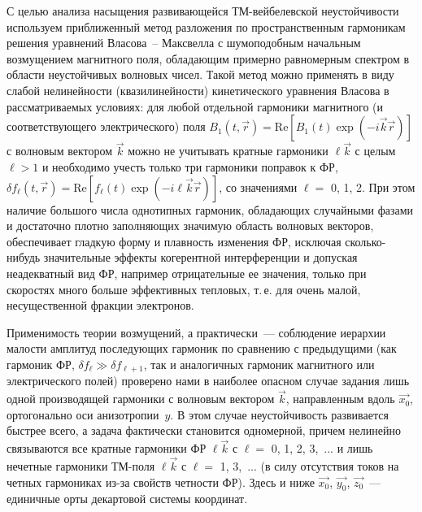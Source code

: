 С целью анализа насыщения развивающейся ТМ-вейбелевской неустойчивости используем приближенный метод разложения по пространственным гармоникам решения уравнений Власова~-- Максвелла с шумоподобным начальным возмущением магнитного поля, обладающим примерно равномерным спектром в области неустойчивых волновых чисел. Такой метод можно применять в виду слабой нелинейности (квазилинейности) кинетического уравнения Власова в рассматриваемых условиях: для любой отдельной гармоники магнитного (и соответствующего электрического) поля $B_1(t,\vec{r})= \mathrm{Re} \left[ B_1(t)\exp(-i\vec{k} \vec{r}) \right]$ с волновым вектором $\vec{k}$ можно не учитывать кратные гармоники $\ell \vec{k}$ с целым $\ell > 1$ и необходимо учесть только три гармоники поправок к ФР, $\delta f_\ell(t, \vec{r})=\mathrm{Re} \left[ f_\ell(t)\exp(-i\ell\vec{k}\vec{r}) \right]$, со значениями $\ell =$ 0, 1, 2. При этом наличие большого числа однотипных гармоник, обладающих случайными фазами и достаточно плотно заполняющих значимую область волновых векторов, обеспечивает гладкую форму и плавность изменения ФР, исключая сколько-нибудь значительные эффекты когерентной интерференции и допуская неадекватный вид ФР, например отрицательные ее значения, только при скоростях много больше эффективных тепловых, т.\,е. для очень малой, несущественной фракции электронов.

Применимость теории возмущений, а практически~--- соблюдение иерархии малости амплитуд последующих гармоник по сравнению с предыдущими (как гармоник ФР, $\delta f_ \ell\gg \delta f_{\ell+1}$, так и аналогичных гармоник магнитного или электрического полей) проверено нами в наиболее опасном случае задания лишь одной производящей гармоники с волновым вектором $\vec{k}$, направленным вдоль $\vec{x_0}$, ортогонально оси анизотропии~$y$. В этом случае неустойчивость развивается быстрее всего, а задача фактически становится одномерной, причем нелинейно связываются все кратные гармоники ФР $\ell\vec{k}$ с $\ell =$ 0, 1, 2, 3,~... и лишь нечетные гармоники ТМ-поля $\ell\vec{k}$ с $\ell =$ 1, 3,~... (в силу отсутствия токов на четных гармониках из-за свойств четности ФР). Здесь и ниже $\vec{x_0}$, $\vec{y_0}$, $\vec{z_0}$~--- единичные орты декартовой системы координат.

